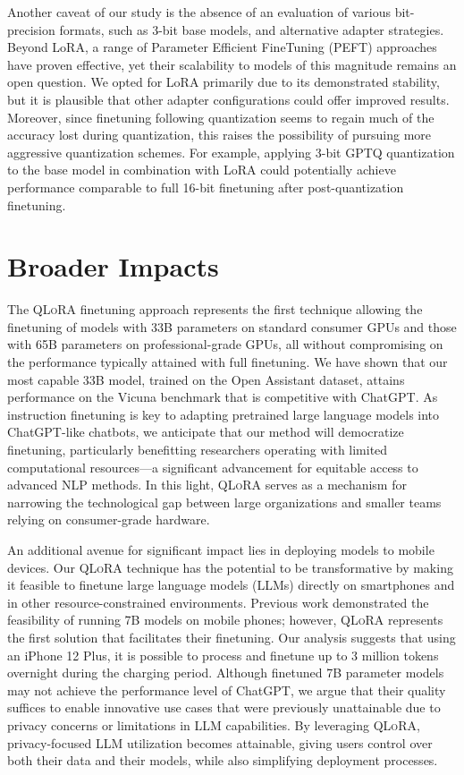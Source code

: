 Another caveat of our study is the absence of an evaluation of various bit-precision formats, such as 3-bit base models, and alternative adapter strategies. Beyond LoRA, a range of Parameter Efficient FineTuning (PEFT) approaches have proven effective, yet their scalability to models of this magnitude remains an open question. We opted for LoRA primarily due to its demonstrated stability, but it is plausible that other adapter configurations could offer improved results. Moreover, since finetuning following quantization seems to regain much of the accuracy lost during quantization, this raises the possibility of pursuing more aggressive quantization schemes. For example, applying 3-bit GPTQ quantization to the base model in combination with LoRA could potentially achieve performance comparable to full 16-bit finetuning after post-quantization finetuning.

\section{Broader Impacts}

The \textsc{QLoRA} finetuning approach represents the first technique allowing the finetuning of models with 33B parameters on standard consumer GPUs and those with 65B parameters on professional-grade GPUs, all without compromising on the performance typically attained with full finetuning. We have shown that our most capable 33B model, trained on the Open Assistant dataset, attains performance on the Vicuna benchmark that is competitive with ChatGPT. As instruction finetuning is key to adapting pretrained large language models into ChatGPT-like chatbots, we anticipate that our method will democratize finetuning, particularly benefitting researchers operating with limited computational resources—a significant advancement for equitable access to advanced NLP methods. In this light, \textsc{QLoRA} serves as a mechanism for narrowing the technological gap between large organizations and smaller teams relying on consumer-grade hardware.

An additional avenue for significant impact lies in deploying models to mobile devices. Our \textsc{QLoRA} technique has the potential to be transformative by making it feasible to finetune large language models (LLMs) directly on smartphones and in other resource-constrained environments. Previous work demonstrated the feasibility of running 7B models on mobile phones; however, \textsc{QLoRA} represents the first solution that facilitates their finetuning. Our analysis suggests that using an iPhone 12 Plus, it is possible to process and finetune up to 3 million tokens overnight during the charging period. Although finetuned 7B parameter models may not achieve the performance level of ChatGPT, we argue that their quality suffices to enable innovative use cases that were previously unattainable due to privacy concerns or limitations in LLM capabilities. By leveraging \textsc{QLoRA}, privacy-focused LLM utilization becomes attainable, giving users control over both their data and their models, while also simplifying deployment processes.

